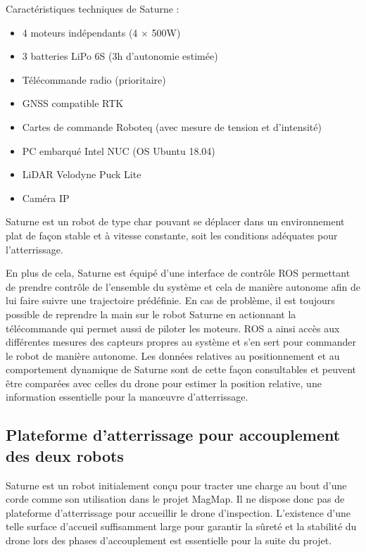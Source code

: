 Caractéristiques techniques de Saturne :
\begin{itemize}
    \item 4 moteurs indépendants (4 $\times$ 500W)
    \item 3 batteries LiPo 6S (3h d’autonomie estimée)
    \item Télécommande radio (prioritaire)
    \item GNSS compatible RTK
    \item Cartes de commande Roboteq (avec mesure de tension et d’intensité) \cite{roboteq}
    \item PC embarqué Intel NUC (OS Ubuntu 18.04) \cite{nuc}
    \item LiDAR Velodyne Puck Lite \cite{velodyne}
    \item Caméra IP
\end{itemize}

Saturne est un robot de type char pouvant se déplacer dans un environnement plat de façon stable et à vitesse constante, soit les conditions adéquates pour l'atterrissage.

En plus de cela, Saturne est équipé d’une interface de contrôle ROS permettant de prendre contrôle de l’ensemble du système et cela de manière autonome afin de lui faire suivre une trajectoire prédéfinie. En cas de problème, il est toujours possible de reprendre la main sur le robot Saturne en actionnant la télécommande qui permet aussi de piloter les moteurs.
ROS a ainsi accès aux différentes mesures des capteurs propres au système et s’en sert pour commander le robot de manière autonome. Les données relatives au positionnement et au comportement dynamique de Saturne sont de cette façon consultables et peuvent être comparées avec celles du drone pour estimer la position relative, une information essentielle pour la manœuvre d’atterrissage.

\subsection{Plateforme d'atterrissage pour accouplement des deux robots}

Saturne est un robot initialement conçu pour tracter une charge au bout d’une corde comme son utilisation dans le projet MagMap. Il ne dispose donc pas de plateforme d’atterrissage pour accueillir le drone d’inspection. L’existence d’une telle surface d’accueil suffisamment large pour garantir la sûreté et la stabilité du drone lors des phases d’accouplement est essentielle pour la suite du projet.

